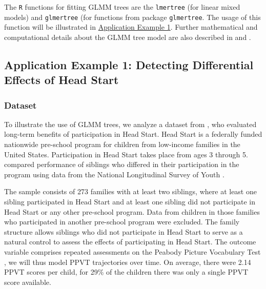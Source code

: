 \documentclass[doc,floatsintext,natbib]{apa7}
\begin{document}
The \texttt{R} functions for fitting GLMM trees are the \texttt{lmertree} (for linear mixed models) and \texttt{glmertree} (for functions from package \texttt{glmertree}. The usage of this function will be illustrated in \hyperref[sec:TutorialMixed]{Application Example 1}. Further mathematical and computational details about the GLMM tree model are also described in \cite{FokkySmit18} and \cite{FokkyZeil24}. 






\subsection{Application Example 1: Detecting Differential Effects of Head Start}
\label{sec:TutorialMixed}



\subsubsection{Dataset}

To illustrate the use of GLMM trees, we analyze a dataset from \cite{Demi09}, who evaluated long-term benefits of participation in Head Start. Head Start is a federally funded nationwide pre-school program for children from low-income families in the United States. Participation in Head Start takes place from ages 3 through 5. \cite{Demi09} compared performance of siblings who differed in their participation in the program using data from the National Longitudinal Survey of Youth \citep{NLSY}. 

The sample consists of 273 families with at least two siblings, where at least one sibling participated in Head Start and at least one sibling did not participate in Head Start or any other pre-school program. Data from children in those families who participated in another pre-school program were excluded. The family structure allows siblings who did not participate in Head Start to serve as a natural control to assess the effects of participating in Head Start. The outcome variable comprises repeated assessments on the Peabody Picture Vocabulary Test \citep[PPVT]{DunnyDunn81}, we will thus model PPVT trajectories over time. On average, there were 2.14 PPVT scores per child, for 29\% of the children there was only a single PPVT score available. 

\end{document}
